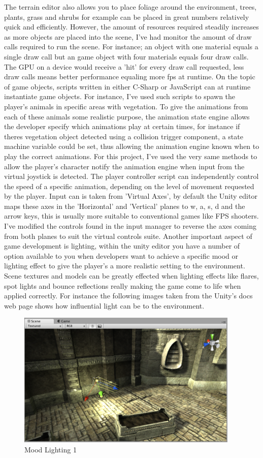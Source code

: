 The terrain editor also allows you to place foliage around the environment, trees, plants, grass and shrubs for example can be placed in great numbers relatively quick and efficiently. However, the amount of resources required steadily increases as more objects are placed into the scene, I've had monitor the amount of draw calls required to run the scene. For instance; an object with one material equals a single draw call but an game object with four materials equals four draw calls. The GPU on a device would receive a 'hit' for every draw call requested, less draw calls means better performance equaling more fps at runtime.
On the topic of game objects, scripts written in either C-Sharp or JavaScript can at runtime instantiate game objects. For instance, I've used such scripts to spawn the player's animals in specific areas with vegetation. To give the animations from each of these animals some realistic purpose, the animation state engine allows the developer specify which animations play at certain times, for instance if theres vegetation object detected using a collision trigger component, a state machine variable could be set, thus allowing the animation engine known when to play the correct animations. For this project, I've used the very same methods to allow the player's character notify the animation engine when input from the virtual joystick is detected. The player controller script can independently control the speed of a specific animation, depending on the level of movement requested by the player. Input can is taken from 'Virtual Axes', by default the Unity editor maps these axes in the 'Horizontal' and 'Vertical' planes to w, a, s, d and the arrow keys, this is usually more suitable to conventional games like FPS shooters. I've modified the controls found in the input manager to reverse the axes coming from both planes to suit the virtual controls suite.
Another important aspect of game development is lighting, within the unity editor you have a number of option available to you when developers want to achieve a specific mood or lighting effect to give the player's a more realistic setting to the environment. Scene textures and models can be greatly effected when lighting effects like flares, spot lights and bounce reflections really making the game come to life when applied correctly. For instance the following images taken from the Unity's docs web page shows how influential light can be to the environment.

\begin{figure}[!ht]
	\caption{Mood Lighting 1}
	\centering
	\includegraphics{img/light-mood-1.png}
\end{figure}

